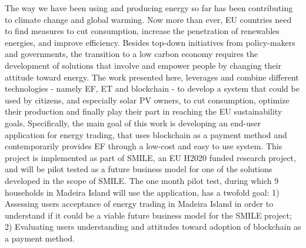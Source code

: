 \noindent The way we have been using and producing energy so far has been contributing to climate change and global warming. Now more than ever, \ac{EU} countries need to find measures to cut consumption, increase the penetration of renewables energies, and improve efficiency. Besides top-down initiatives from policy-makers and governments, the transition to a low carbon economy requires the development of solutions that involve and empower people by changing their attitude toward energy. The work presented here, leverages and combine different technologies - namely \ac{EF}, \ac{ET} and blockchain - to develop a system that could be used by citizens, and especially solar \ac{PV} owners, to cut consumption, optimize their production and finally play their part in reaching the \ac{EU} sustainability goals.
Specifically, the main goal of this work is developing an end-user application for energy trading, that uses blockchain as a payment method and contemporarily provides \ac{EF} through a low-cost and easy to use system. This project is implemented as part of \ac{SMILE}, an \ac{EU} H2020 funded research project, and will be pilot tested as a future business model for one of the solutions developed in the scope of SMILE.
The one month pilot test, during which 9 households in Madeira Island will use the application, has a twofold goal:
1) Assessing users acceptance of energy trading in Madeira Island in order to understand if it could be a viable future business model for the \ac{SMILE} project;
2) Evaluating users understanding  and attitudes toward adoption of blockchain as a payment method.
